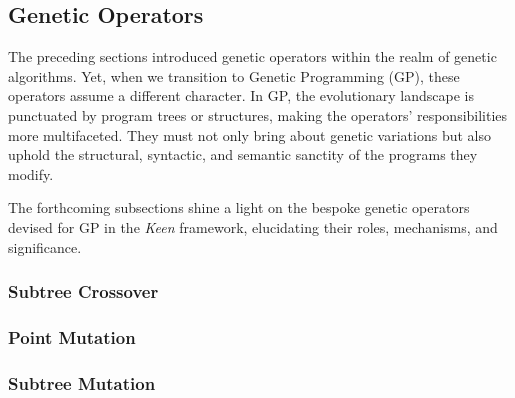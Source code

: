\subsection{Genetic Operators}
\label{sec:keen:gp:op}
  The preceding sections introduced genetic operators within the realm of genetic 
  algorithms. Yet, when we transition to Genetic Programming (GP), these operators 
  assume a different character. In GP, the evolutionary landscape is punctuated by 
  program trees or structures, making the operators' responsibilities more 
  multifaceted. They must not only bring about genetic variations but also uphold 
  the structural, syntactic, and semantic sanctity of the programs they modify.

  The forthcoming subsections shine a light on the bespoke genetic operators 
  devised for GP in the \textit{Keen} framework, elucidating their roles, 
  mechanisms, and significance.

  \subsubsection{Subtree Crossover}
  \label{sec:keen:gp:op:cx:subtree}
  \Blindtext

  \subsubsection{Point Mutation}
  \label{sec:keen:gp:op:mutation:point}
  \Blindtext

  \subsubsection{Subtree Mutation}
  \label{sec:keen:op:mut:subtree}
  \Blindtext